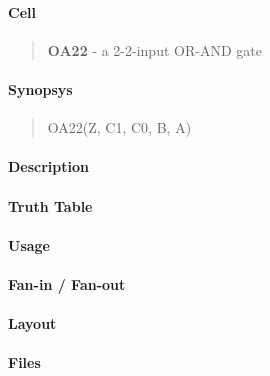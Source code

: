 \label{OA22}
\paragraph{Cell}
\begin{quote}
    \textbf{OA22} - a 2-2-input OR-AND gate
\end{quote}

\paragraph{Synopsys}
\begin{quote}
    OA22(Z, C1, C0, B, A)
\end{quote}

\paragraph{Description}

%

\paragraph{Truth Table}
%

\paragraph{Usage}

\paragraph{Fan-in / Fan-out}

\paragraph{Layout}

\paragraph{Files}
